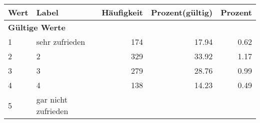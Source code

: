      \begin{longtable}{lXrrr}
     \toprule
     \textbf{Wert} & \textbf{Label} & \textbf{Häufigkeit} & \textbf{Prozent(gültig)} & \textbf{Prozent} \\
     \endhead
     \midrule
     \multicolumn{5}{l}{\textbf{Gültige Werte}}\\

     1 &
     \multicolumn{1}{X}{ sehr zufrieden   } &


       \num{174} &
       \num[round-mode=places,round-precision=2]{17.94} &
         \num[round-mode=places,round-precision=2]{0.62} \\

     2 &
     \multicolumn{1}{X}{ 2   } &


       \num{329} &
       \num[round-mode=places,round-precision=2]{33.92} &
         \num[round-mode=places,round-precision=2]{1.17} \\

     3 &
     \multicolumn{1}{X}{ 3   } &


       \num{279} &
       \num[round-mode=places,round-precision=2]{28.76} &
         \num[round-mode=places,round-precision=2]{0.99} \\

     4 &
     \multicolumn{1}{X}{ 4   } &


       \num{138} &
       \num[round-mode=places,round-precision=2]{14.23} &
         \num[round-mode=places,round-precision=2]{0.49} \\

     5 &
     \multicolumn{1}{X}{ gar nicht zufrieden   } &



\end{longtable}
